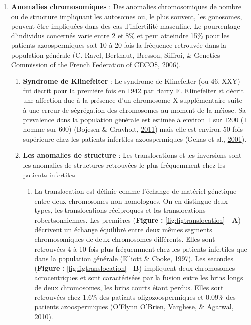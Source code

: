 \documentclass[12pt,twoside]{reedthesis}
\providecommand{\tightlist}{%
  \setlength{\itemsep}{0pt}\setlength{\parskip}{0pt}}
\theoremstyle{definition}
\theoremstyle{definition}
\theoremstyle{remark}
\begin{document}
  \begin{enumerate}
  \def\labelenumi{\arabic{enumi}.}
  \setcounter{enumi}{1}
  \tightlist
  \item
    \textbf{Anomalies chromosomiques} : Des anomalies chromosomiques de
    nombre ou de structure impliquant les autosomes ou, le plus souvent,
    les gonosomes, peuvent être impliquées dans des cas d'infertilité
    masculine. Le pourcentage d'individus concernés varie entre 2 et 8\%
    et peut atteindre 15\% pour les patients azoospermiques soit 10 à 20
    fois la fréquence retrouvée dans la population générale (C. Ravel,
    Berthaut, Bresson, Siffroi, \& Genetics Commission of the French
    Federation of CECOS, \protect\hyperlink{ref-Ravel2006}{2006}).
  
    \begin{enumerate}
    \def\labelenumii{\alph{enumii}.}
    \item
      \textbf{Syndrome de Klinefelter} : Le syndrome de Klinefelter (ou
      46, XXY) fut décrit pour la première fois en 1942 par Harry F.
      Klinefelter et décrit une affection due à la présence d'un
      chromosome X supplémentaire suite à une erreur de ségrégation des
      chromosomes au moment de la méiose. Sa prévalence dans la population
      générale est estimée à environ 1 sur 1200 (1 homme sur 600) (Bojesen
      \& Gravholt, \protect\hyperlink{ref-Bojesen2011}{2011}) mais elle
      est environ 50 fois supérieure chez les patients infertiles
      azoospermiques (Gekas et al.,
      \protect\hyperlink{ref-Gekas2001}{2001}).
    \item
      \textbf{Les anomalies de structure} : Les translocations et les
      inversions sont les anomalies de structures retrouvées le plus
      fréquemment chez les patients infertiles.
  
      \begin{enumerate}
      \def\labelenumiii{\roman{enumiii}.}
      \tightlist
      \item
        La translocation est définie comme l'échange de matériel génétique
        entre deux chromosomes non homologues. On en distingue deux types,
        les translocations réciproques et les translocations
        robertsonniennes. Les premières (\textbf{Figure :}
        \ref{fig:figtranslocation} - \textbf{A}) décrivent un échange
        équilibré entre deux mêmes segments chromosomiques de deux
        chromosomes différents. Elles sont retrouvées 4 à 10 fois plus
        fréquemment chez les patients infertiles que dans la population
        générale (Elliott \& Cooke,
        \protect\hyperlink{ref-Elliott1997}{1997}). Les secondes
        (\textbf{Figure :} \ref{fig:figtranslocation} - \textbf{B})
        impliquent deux chromosomes acrocentriques et sont caractérisées
        par la fusion entre les brins longs de deux chromosomes, les brins
        courts étant perdus. Elles sont retrouvées chez 1.6\% des patients
        oligozoospermiques et 0.09\% des patients azoospermiques (O'Flynn
        O'Brien, Varghese, \& Agarwal,
        \protect\hyperlink{ref-OFlynnOBrien2010}{2010}).
      \end{enumerate}
    \end{enumerate}
  \end{enumerate}
  
\end{document}

